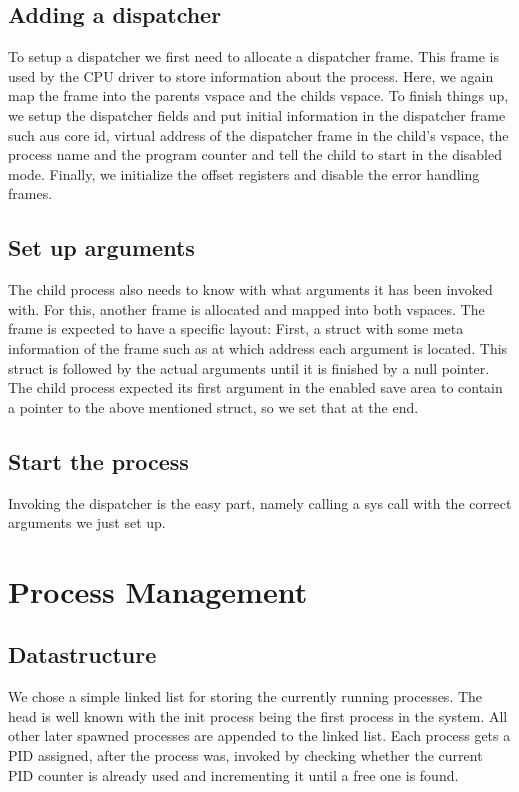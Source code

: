 \subsection{Adding a dispatcher} 

To setup a dispatcher we first need to allocate
a dispatcher frame. This frame is used by the CPU driver to store information
about the process. Here, we again map the frame into the parents vspace and the
childs vspace.  To finish things up, we setup the dispatcher fields and put
initial information in the dispatcher frame such aus core id, virtual address of
the dispatcher frame in the child's vspace, the process name and the program
counter and tell the child to start in the disabled mode.  Finally, we
initialize the offset registers and disable the error handling frames.

\subsection{Set up arguments} 

The child process also needs to know with what
arguments it has been invoked with. For this, another frame is allocated and
mapped into both vspaces.  The frame is expected to have a specific layout:
First, a struct with some meta information of the frame such as at which
address each argument is located.  This struct is followed by the actual
arguments until it is finished by a null pointer.  The child process expected
its first argument in the enabled save area to contain a pointer to the above
mentioned struct, so we set that at the end.

\subsection{Start the process} 

Invoking the dispatcher is the easy part, namely
calling a sys call with the correct arguments we just set up.

\section{Process Management}

\subsection{Datastructure} 

We chose a simple linked list for storing the
currently running processes. The head is well known with the init process being
the first process in the system.  All other later spawned processes are appended
to the linked list.  Each process gets a PID assigned, after the process was,
invoked by checking whether the current PID counter is already used and incrementing it until a free one is found.

